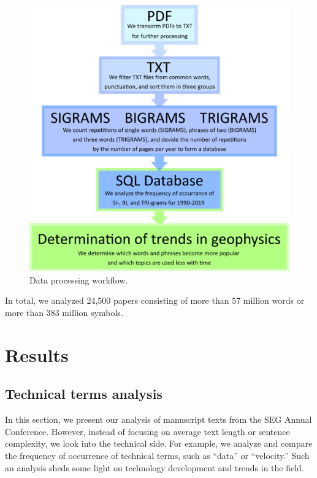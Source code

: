 \documentclass[geosciences,article,submit,moreauthors,pdftex]{Definitions/mdpi}
\begin{document}
\begin{figure}[ht!]
\centering
\includegraphics[scale=1]{scheme.png}
\caption{Data processing workflow.}
\label{scheme_workflow}
\end{figure}


In total, we analyzed 24,500 papers consisting of more than 57 million words or more than 383 million symbols.

 
\section{Results}

\subsection{Technical terms analysis}
In this section, we present our analysis of manuscript texts from the SEG Annual Conference. However, instead of focusing on average text length or sentence complexity, we look into the technical side. For example, we analyze and compare the frequency of occurrence of technical terms, such as ``data'' or ``velocity.'' Such an analysis sheds some light on technology development and trends in the field.
\end{document}
